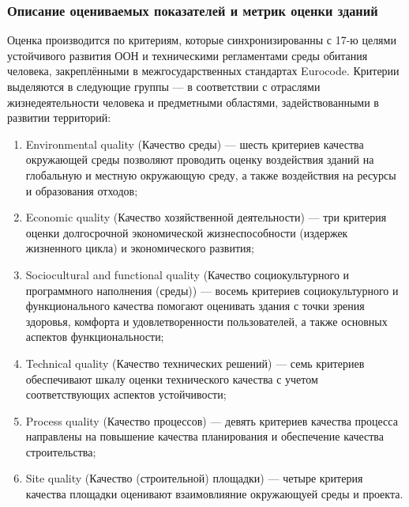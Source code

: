 \subsubsection*{Описание оцениваемых показателей и метрик оценки зданий}
Оценка производится по критериям, которые синхронизированны с 17-ю целями устойчивого развития ООН \cite{UN_17Goals} и техническими регламентами среды обитания человека,
закреплёнными в межгосударственных стандартах Eurocode. Критерии выделяются в следующие группы --- в соответствии с отраслями жизнедеятельности человека и предметными областями,
задействованными в развитии территорий:
\begin{enumerate}[1)]
    \item Environmental quality (Качество среды) --- шесть критериев качества окружающей среды позволяют проводить оценку воздействия зданий на глобальную и местную окружающую среду, а также воздействия на ресурсы и образования отходов;
    \item Economic quality (Качество хозяйственной деятельности) --- три критерия оценки долгосрочной экономической жизнеспособности (издержек жизненного цикла) и экономического развития;
    \item Sociocultural and functional quality (Качество социокультурного и программного наполнения (среды)) --- восемь критериев социокультурного и функционального качества помогают оценивать здания с точки зрения здоровья, комфорта и удовлетворенности пользователей, а также основных аспектов функциональности;
    \item Technical quality (Качество технических решений) --- семь критериев обеспечивают шкалу оценки технического качества с учетом соответствующих аспектов устойчивости;
    \item Process quality (Качество процессов) --- девять критериев качества процесса направлены на повышение качества планирования и обеспечение качества строительства;
    \item Site quality (Качество (строительной) площадки) --- четыре критерия качества площадки оценивают взаимовлияние окружающуей среды и проекта.
\end{enumerate}


